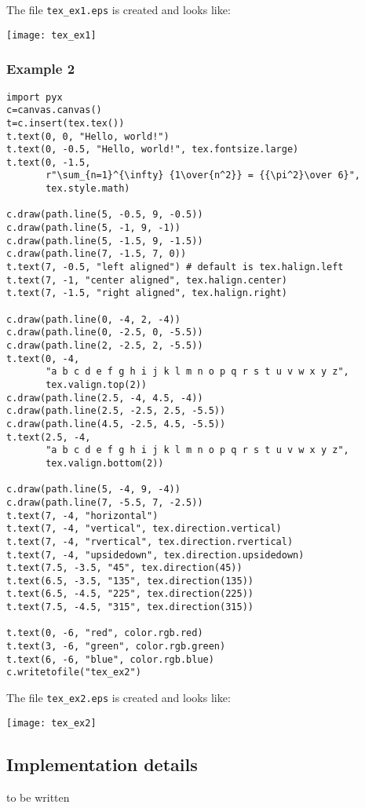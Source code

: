 The file \verb|tex_ex1.eps| is created and looks like:

\texttt{[image: tex\_ex1]}

\subsubsection{Example 2}
\begin{verbatim}
import pyx
c=canvas.canvas()
t=c.insert(tex.tex())
t.text(0, 0, "Hello, world!")
t.text(0, -0.5, "Hello, world!", tex.fontsize.large)
t.text(0, -1.5,
       r"\sum_{n=1}^{\infty} {1\over{n^2}} = {{\pi^2}\over 6}",
       tex.style.math)

c.draw(path.line(5, -0.5, 9, -0.5))
c.draw(path.line(5, -1, 9, -1))
c.draw(path.line(5, -1.5, 9, -1.5))
c.draw(path.line(7, -1.5, 7, 0))
t.text(7, -0.5, "left aligned") # default is tex.halign.left
t.text(7, -1, "center aligned", tex.halign.center)
t.text(7, -1.5, "right aligned", tex.halign.right)

c.draw(path.line(0, -4, 2, -4))
c.draw(path.line(0, -2.5, 0, -5.5))
c.draw(path.line(2, -2.5, 2, -5.5))
t.text(0, -4,
       "a b c d e f g h i j k l m n o p q r s t u v w x y z",
       tex.valign.top(2))
c.draw(path.line(2.5, -4, 4.5, -4))
c.draw(path.line(2.5, -2.5, 2.5, -5.5))
c.draw(path.line(4.5, -2.5, 4.5, -5.5))
t.text(2.5, -4,
       "a b c d e f g h i j k l m n o p q r s t u v w x y z",
       tex.valign.bottom(2))

c.draw(path.line(5, -4, 9, -4))
c.draw(path.line(7, -5.5, 7, -2.5))
t.text(7, -4, "horizontal")
t.text(7, -4, "vertical", tex.direction.vertical)
t.text(7, -4, "rvertical", tex.direction.rvertical)
t.text(7, -4, "upsidedown", tex.direction.upsidedown)
t.text(7.5, -3.5, "45", tex.direction(45))
t.text(6.5, -3.5, "135", tex.direction(135))
t.text(6.5, -4.5, "225", tex.direction(225))
t.text(7.5, -4.5, "315", tex.direction(315))

t.text(0, -6, "red", color.rgb.red)
t.text(3, -6, "green", color.rgb.green)
t.text(6, -6, "blue", color.rgb.blue)
c.writetofile("tex_ex2")
\end{verbatim}

The file \verb|tex_ex2.eps| is created and looks like:

\texttt{[image: tex\_ex2]}

\subsection{Implementation details}
to be written

